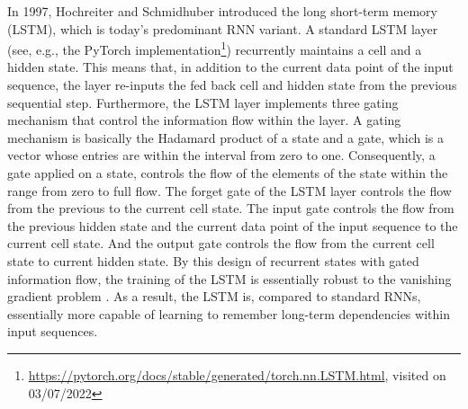In 1997, Hochreiter and Schmidhuber \cite{Hochreiter1997} introduced
the long short-term memory (LSTM),
which is today's predominant \cite{schmidhuber_2021} RNN variant.
A standard LSTM layer
(see, e.g., the PyTorch implementation\footnote{
    \url{https://pytorch.org/docs/stable/generated/torch.nn.LSTM.html}, visited on 03/07/2022
})
recurrently maintains a cell and a hidden state.
This means that,
in addition to the current data point of the input sequence,
the layer re-inputs the fed back cell and hidden state
from the previous sequential step.
Furthermore, the LSTM layer implements three gating mechanism
that control the information flow within the layer.
A gating mechanism is basically
the Hadamard product of a state and a gate, which is a vector whose entries 
are within the interval from zero to one. 
Consequently, a gate applied on a state, controls the 
flow of the elements of the state within the range from zero to full flow.
The forget gate of the LSTM layer controls
the flow from the previous to the current cell state.
The input gate controls the flow from the
previous hidden state and the current data point of the input sequence
to the current cell state.
And the output gate controls
the flow from the current cell state to current hidden state.
By this design of recurrent states with gated information flow,
the training of the LSTM is essentially 
robust to the vanishing gradient problem \cite{pascanu2013difficulty}.
As a result, the LSTM is, compared to standard RNNs, essentially 
more capable of learning to remember long-term dependencies within input sequences.





